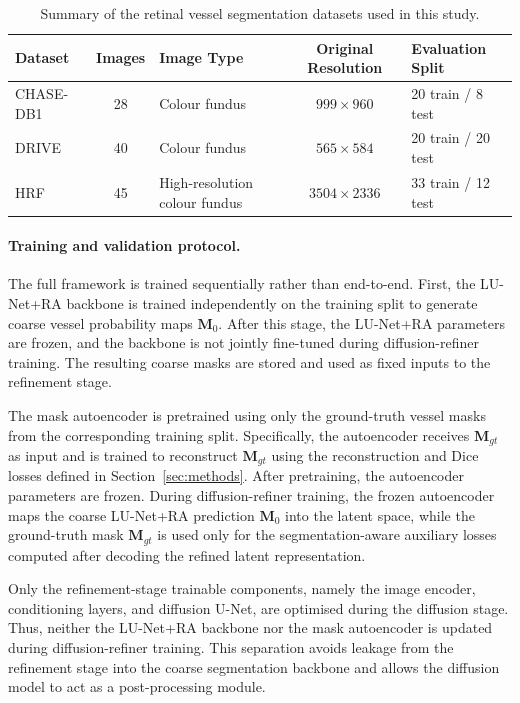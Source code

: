 \documentclass[journal,article,submit,pdftex,moreauthors]{Definitions/mdpi}
\begin{document}
\begin{table}[H]
\centering
\caption{Summary of the retinal vessel segmentation datasets used in this study.}
\label{tab:datasets}
\small
\begin{tabularx}{\textwidth}{l c X c X}
\toprule
Dataset & Images & Image Type & Original Resolution & Evaluation Split \\
\midrule
CHASE-DB1 & 28 & Colour fundus & $999\times960$ & 20 train / 8 test \\
DRIVE & 40 & Colour fundus & $565\times584$ & 20 train / 20 test \\
HRF & 45 & High-resolution colour fundus & $3504\times2336$ & 33 train / 12 test \\
\bottomrule
\end{tabularx}
\end{table}


\paragraph{Training and validation protocol.}
The full framework is trained sequentially rather than end-to-end. First, the LU-Net+RA backbone is trained independently on the training split to generate coarse vessel probability maps $\mathbf{M}_0$. After this stage, the LU-Net+RA parameters are frozen, and the backbone is not jointly fine-tuned during diffusion-refiner training. The resulting coarse masks are stored and used as fixed inputs to the refinement stage.

The mask autoencoder is pretrained using only the ground-truth vessel masks from the corresponding training split. Specifically, the autoencoder receives $\mathbf{M}_{gt}$ as input and is trained to reconstruct $\mathbf{M}_{gt}$ using the reconstruction and Dice losses defined in Section~\ref{sec:methods}. After pretraining, the autoencoder parameters are frozen. During diffusion-refiner training, the frozen autoencoder maps the coarse LU-Net+RA prediction $\mathbf{M}_0$ into the latent space, while the ground-truth mask $\mathbf{M}_{gt}$ is used only for the segmentation-aware auxiliary losses computed after decoding the refined latent representation.

Only the refinement-stage trainable components, namely the image encoder, conditioning layers, and diffusion U-Net, are optimised during the diffusion stage. Thus, neither the LU-Net+RA backbone nor the mask autoencoder is updated during diffusion-refiner training. This separation avoids leakage from the refinement stage into the coarse segmentation backbone and allows the diffusion model to act as a post-processing module.
\end{document}
